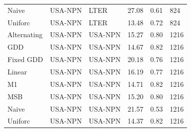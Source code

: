 \begin{table}
\begin{tabularx}{6.5in}{XXXXXX}
Naive & USA-NPN & LTER & 27.08 & 0.61 & 824\\
Uniforc & USA-NPN & LTER & 13.48 & 0.72 & 824\\
Alternating & USA-NPN & USA-NPN & 15.27 & 0.80 & 1216\\
GDD & USA-NPN & USA-NPN & 14.67 & 0.82 & 1216\\
Fixed GDD & USA-NPN & USA-NPN & 20.18 & 0.76 & 1216\\
Linear & USA-NPN & USA-NPN & 16.19 & 0.77 & 1216\\
M1 & USA-NPN & USA-NPN & 14.71 & 0.82 & 1216\\
MSB & USA-NPN & USA-NPN & 15.20 & 0.80 & 1216\\
Naive & USA-NPN & USA-NPN & 21.57 & 0.53 & 1216\\
Uniforc & USA-NPN & USA-NPN & 14.37 & 0.82 & 1216\\

\hline
\end{tabularx}
\end{table}